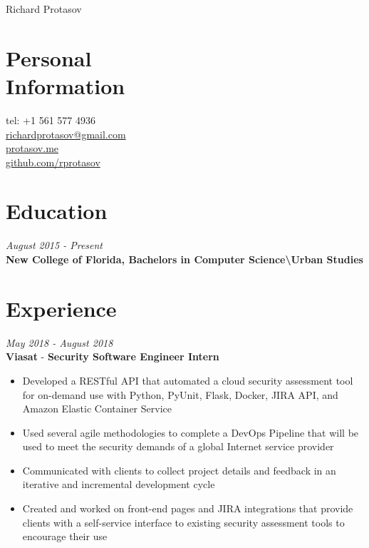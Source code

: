 \documentclass[margin,line,a4paper]{resume}
\begin{document}
{\sc \Huge Richard Protasov}
\begin{resume}
    \vspace{0cm}

    \section{\mysidestyle Personal\\Information}
    tel: +1 561 577 4936 \\
    \href{mailto:richardprotasov@gmail.com}{richardprotasov@gmail.com} \\
    \href{https://protasov.me}{protasov.me}\\
    \href{https://github.com/rprotasov}{github.com/rprotasov}
    
    \section{\mysidestyle Education}
        \textit{August 2015 - Present}\\
        \textbf{New College of Florida, Bachelors in Computer Science\textbackslash Urban Studies}
        
    \section{\mysidestyle Experience}
        \textit{May 2018 - August 2018}\\
        \textbf{Viasat} - \textbf{Security Software Engineer Intern}
        \begin{itemize}
            \item Developed a RESTful API that automated a cloud security assessment tool for on-demand use with Python, PyUnit, Flask, Docker, JIRA API, and Amazon Elastic Container Service
            \item Used several agile methodologies to complete a DevOps Pipeline that will be used to meet the security demands of a global Internet service provider
            \item Communicated with clients to collect project details and feedback in an iterative and incremental development cycle
            \item Created and worked on front-end pages and JIRA integrations that provide clients with a self-service interface to existing security assessment tools to encourage their use
        \end{itemize}


\end{resume}
\end{document}
